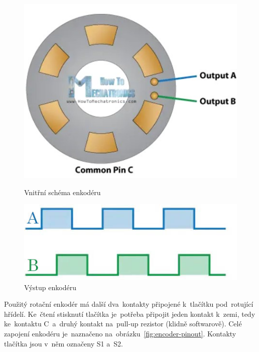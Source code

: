 \begin{figure}[htb]
  \centering
  \begin{minipage}{0.45\textwidth}
    \centering
    \includegraphics[width=1\textwidth]{img/encoder-working.jpg}
    \caption{\label{fig:encoder-working} Vnitřní schéma enkodéru~\cite{how-encoders-work}}
  \end{minipage}\hfill
  \begin{minipage}{0.45\textwidth}
    \centering
    \includegraphics[width=1\textwidth]{img/encoder-graph.jpg}
    \caption{\label{fig:encoder-graph} Výstup enkodéru~\cite{how-encoders-work}}
  \end{minipage}
\end{figure}

Použitý rotační enkodér má další  dva~kontakty připojené  k~tlačítku  pod~rotující hřídelí.
Ke~čtení stisknutí tlačítka je~potřeba připojit jeden kontakt  k~zemi, tedy ke~kontaktu  C~a~druhý kontakt na~pull-up rezistor (klidně softwarově).
Celé zapojení enkodéru je~naznačeno na~obrázku~\ref{fig:encoder-pinout}. Kontakty tlačítka jsou  v~něm označeny S1 a~S2.

